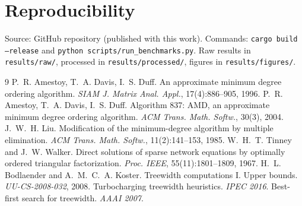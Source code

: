 \documentclass[11pt]{article}
\theoremstyle{plain}
\theoremstyle{definition}
\begin{document}
\section*{Reproducibility}
Source: GitHub repository (published with this work). Commands:
\texttt{cargo build --release} and \texttt{python scripts/run\_benchmarks.py}. Raw results in
\texttt{results/raw/}, processed in \texttt{results/processed/}, figures in
\texttt{results/figures/}.

\begin{thebibliography}{9}
 P.~R. Amestoy, T.~A. Davis, I.~S. Duff.
  An approximate minimum degree ordering algorithm.
  \emph{SIAM J. Matrix Anal. Appl.}, 17(4):886--905, 1996.
 P.~R. Amestoy, T.~A. Davis, I.~S. Duff.
  Algorithm 837: AMD, an approximate minimum degree ordering algorithm.
  \emph{ACM Trans. Math. Softw.}, 30(3), 2004.
 J.~W.~H. Liu. Modification of the minimum-degree algorithm by multiple
  elimination. \emph{ACM Trans. Math. Softw.}, 11(2):141--153, 1985.
 W.~H.~T. Tinney and J.~W. Walker. Direct solutions of sparse network equations
  by optimally ordered triangular factorization. \emph{Proc. IEEE}, 55(11):1801--1809, 1967.
 H.~L. Bodlaender and A.~M.~C.~A. Koster. Treewidth computations I. Upper bounds.
  \emph{UU-CS-2008-032}, 2008.
 Turbocharging treewidth heuristics. \emph{IPEC 2016}.
 Best-first search for treewidth. \emph{AAAI 2007}.
\end{thebibliography}
\end{document}
